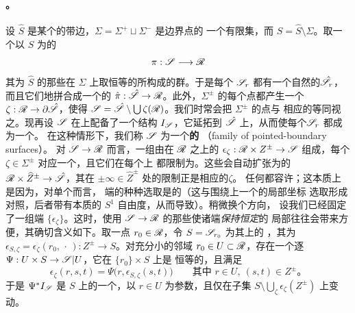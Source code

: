 \paragraph{\trFamily。}\label{sub:families}
设 $\hat{S}$ 是某个\trSmooth{}的\trOrientation{}带边\trSurface，$\Sigma=\Sigma^+\sqcup\Sigma^-$ 是边界点的
一个有限集，而 $S=\hat{S}\setminus\Sigma$。取一个以 $S$ 为\trFiber{}的\trFiberBundle
\begin{equation*}
\pi:\mathscr{S}\longrightarrow\mathscr{R}
\end{equation*}
其\trStructureGroup{}为 $\hat{S}$ 的那些在 $\Sigma$ 上取恒等的\trOrientation\trDiffeomorphism{}所构成的群。于是每个%
\trFiber{}$\mathscr{S}_r$ 都有一个自然的\trCompactification{}$\hat{\mathscr{S}}_r$，而且它们\trCanonical{}地拼合成一个\trSmooth{}的%
\trProper\trFiberBundle{}$\hat{\pi}:\hat{\mathscr{S}}\to\mathscr{R}$。此外，$\Sigma^{\pm}$ 的每个点都产生一个\trSection%
$\zeta:\mathscr{R}\to\partial\hat{\mathscr{S}}$，使得 $\mathscr{S}=\hat{\mathscr{S}}\setminus\bigcup\zeta(\mathscr{R})$。我们时常会把 $\Sigma^{\pm}$ 的点与
相应的\trSection{}等同视之。现再设 $\mathscr{S}$ 在\trFibrewise\trTangentBundle{}上配备了一个\trAlmostComplex{}结构
$I_{\mathscr{S}}$，它延拓到 $\hat{\mathscr{S}}$ 上，从而使每个\trFiber{}$\mathscr{S}_r$ 都成为一个\trPointedBoundary\trRiemann\trSurface。
在这种情形下，我们称 $\mathscr{S}$ 为一个\textbf{\trPointedBoundary{}的\trSurface\trFamily}%
（family of pointed-boundary surfaces）。
对 $\mathscr{S}\to\mathscr{R}$ 而言，一组\trStriplikeEnd{}由\trFibration{}在 $\mathscr{R}$ 之上的\trProper\trEmbedding%
$\epsilon_\zeta:\mathscr{R}\times Z^{\pm}\to\mathscr{S}$ 组成，每个 $\zeta\in\Sigma^{\pm}$ 对应一个，且它们在每个\trFiber{}上
都限制为\trStriplikeEnd。这些\trEmbedding{}会自动扩张为\trSmooth{}的\trFibrewise\trHolomorphic\trEmbedding%
$\mathscr{R}\times\widehat{Z}^{\pm}\to\hat{\mathscr{S}}$，其在 $\pm\infty\in\widehat{Z}^{\pm}$ 处的限制正是相应的\trSection{}$\zeta$。
任何\trFamily{}都容许\trStriplikeEnd；这本质上是因为，对单个\trPointedBoundary\trRiemann\trSurface{}而言，
端的种种选取是\trContractible{}的（这与围绕\trRiemann\trSurface{}上一个\trInteriorPoint{}的局部坐标
选取形成对照，后者带有本质的 $S^1$ 自由度，从而导致\trGravitationalDescendant）。稍微换个方向，
设我们已经固定了一组端 $\{\epsilon_\zeta\}$。这时，使用 $\mathscr{S}\to\mathscr{R}$ 的那些使诸端\emph{保持恒定}的
局部\trTrivialization{}往往会带来方便，其确切含义如下。取一点 $r_0\in\mathscr{R}$，令 $S=\mathscr{S}_{r_0}$ 为其上的%
\trFiber，其\trStriplikeEnd{}为 $\epsilon_{S,\zeta}=\epsilon_\zeta(r_0,\,\cdot\,):Z^{\pm}\to S$。对充分小的邻域
$r_0\in U\subset\mathscr{R}$，存在一个逐\trFiber\trDiffeomorphism{}$\Psi:U\times S\to\mathscr{S}|U$，它在 $\{r_0\}\times S$ 上是
恒等的，且满足
\begin{equation}\label{eq:family-trivialization}
\epsilon_\zeta(r,s,t)=\Psi\bigl(r,\epsilon_{S,\zeta}(s,t)\bigr)
\qquad\text{其中 }r\in U,\ (s,t)\in Z^{\pm}\text{。}
\end{equation}
于是 $\Psi^*I_{\mathscr{S}}$ 是 $S$ 上的一个\trComplexStructure\trFamily，以 $r\in U$ 为参数，且仅在\trCompact{}子集
$S\setminus\bigcup_\zeta\epsilon_\zeta(Z^{\pm})$ 上变动。
